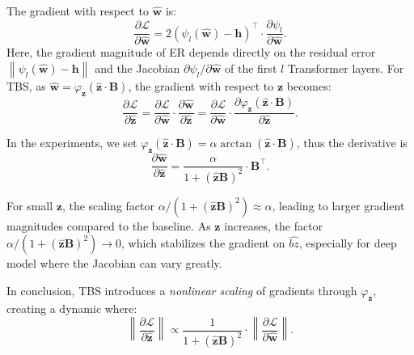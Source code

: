 \documentclass[letterpaper,twocolumn,10pt]{article}
\newcommand{\transformer}{\psi}
\newcommand{\interstatesalone}{\bh}
\newcommand{\varchangetbs}{\varphi_\bz}
\newcommand{\bh}{\mathbf{h}}
\newcommand{\bw}{\mathbf{w}}
\newcommand{\bz}{\mathbf{z}}
\newcommand{\bB}{\mathbf{B}}
\newcommand{\norm}[1]{\left\lVert#1\right\rVert}
\theoremstyle{definition}
\begin{document}
The gradient with respect to $\widehat{\bw}$ is:
\begin{equation}
\frac{\partial \mathcal{L}}{\partial \widehat{\bw}} = 2 \left( \transformer_l(\widehat{\bw}) - \interstatesalone \right)^\top \cdot \frac{\partial \transformer_l}{\partial \widehat{\bw}}.
\end{equation}
Here, the gradient magnitude of ER depends directly on the residual error $\norm{\transformer_l(\widehat{\bw}) - \interstatesalone}$ and the Jacobian $\partial \transformer_l/\partial \widehat{\bw}$ of the first $l$ Transformer layers.
For TBS, as $\widehat{\bw}=\varchangetbs(\widehat{\bz}\cdot \bB)$, the gradient with respect to $\bz$ becomes:
\begin{equation}
    \frac{\partial \mathcal{L}}{\partial \widehat{\bz}} = \frac{\partial \mathcal{L}}{\partial \widehat{\bw}} \cdot \frac{\partial \widehat{\bw}}{\partial \widehat{\bz}} = \frac{\partial \mathcal{L}}{\partial \widehat{\bw}} \cdot \frac{\partial \varchangetbs(\widehat{\bz} \cdot \bB)}{\partial \widehat{\bz}}.
\end{equation}

In the experiments, we set $\varchangetbs(\widehat{\bz} \cdot \bB)=\alpha\arctan(\widehat{\bz} \cdot \bB)$, thus the derivative is
\begin{equation}
    \frac{\partial \widehat{\bw}}{\partial \widehat{\bz}} = \frac{\alpha}{1+(\widehat{\bz}\bB)^2} \cdot\bB^\top.
\end{equation}


For small $\bz$, the scaling factor $\alpha / (1 + (\widehat{\bz}\bB)^2)\approx \alpha$, leading to larger gradient magnitudes compared to the baseline.
As $\bz$ increases, the factor $\alpha / (1 + (\widehat{\bz}\bB)^2) \to 0$, which stabilizes the gradient on $\widehat{bz}$, especially for deep model where the Jacobian can vary greatly.

In conclusion, TBS introduces a \textit{nonlinear scaling} of gradients through $\varchangetbs$, creating a dynamic where:
\begin{equation}
\norm{\frac{\partial \mathcal{L}}{\partial \widehat{\bz}}} \propto \frac{1}{1 + (\widehat{\bz}\bB)^2} \cdot \norm{\frac{\partial \mathcal{L}}{\partial \widehat{\bw}}}.
\end{equation}
\end{document}
